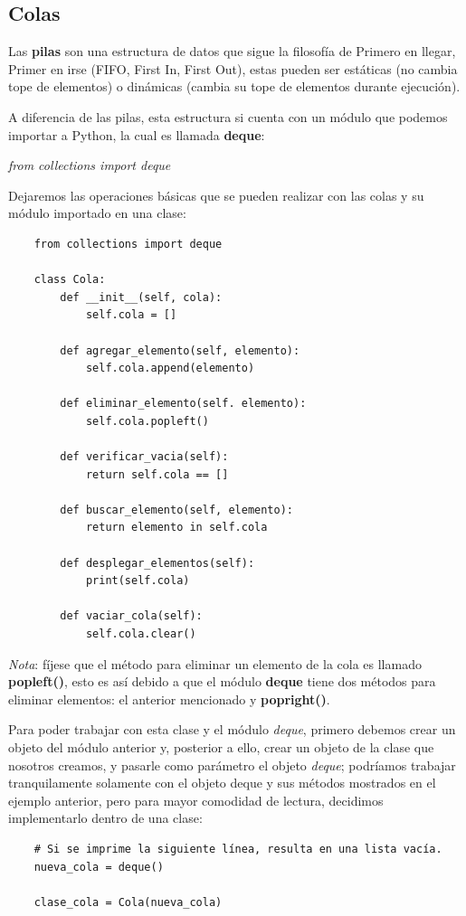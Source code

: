 \subsection{Colas}
\hspace{0.55cm}Las \textbf{pilas} son una estructura de datos que sigue la filosofía de Primero en llegar, Primer en irse (FIFO, First In, First Out), estas pueden ser estáticas (no cambia tope de elementos) o dinámicas (cambia su tope de elementos durante ejecución).

A diferencia de las pilas, esta estructura si cuenta con un módulo que podemos importar a Python, la cual es llamada \textbf{deque}:
\begin{center}
	\textit{from collections import deque}
\end{center}

Dejaremos las operaciones básicas que se pueden realizar con las colas y su módulo importado en una clase:
\begin{lstlisting}
	from collections import deque

	class Cola:
		def __init__(self, cola):
			self.cola = []
			
		def agregar_elemento(self, elemento):
			self.cola.append(elemento)
			
		def eliminar_elemento(self. elemento):
			self.cola.popleft()
			
		def verificar_vacia(self):
			return self.cola == []
			
		def buscar_elemento(self, elemento):
			return elemento in self.cola
				
		def desplegar_elementos(self):
			print(self.cola)
			
		def vaciar_cola(self):
			self.cola.clear()
\end{lstlisting}

\textit{Nota}: fíjese que el método para eliminar un elemento de la cola es llamado \textbf{popleft()}, esto es así debido a que el módulo \textbf{deque} tiene dos métodos para eliminar elementos: el anterior mencionado y \textbf{popright()}.

Para poder trabajar con esta clase y el módulo \textit{deque}, primero debemos crear un objeto del módulo anterior y, posterior a ello, crear un objeto de la clase que nosotros creamos, y pasarle como parámetro el objeto \textit{deque}; podríamos trabajar tranquilamente solamente con el objeto deque y sus métodos mostrados en el ejemplo anterior, pero para mayor comodidad de lectura, decidimos implementarlo dentro de una clase:
\begin{lstlisting}
	# Si se imprime la siguiente línea, resulta en una lista vacía.
	nueva_cola = deque()
	
	clase_cola = Cola(nueva_cola)
\end{lstlisting}


